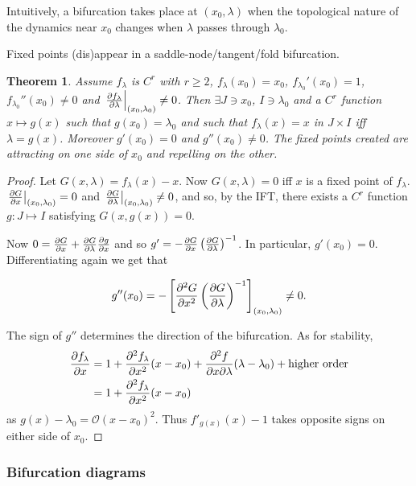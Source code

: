 \documentclass{notes}
\newcommand{\cO}{\mathcal{O}}
\theoremstyle{plain}
\newtheorem{theorem}[proposition]{Theorem}
\begin{document}
Intuitively, a bifurcation takes place at $(x_0,\lambda)$ when the
topological nature of the dynamics near $x_0$ changes when $\lambda$ passes
through $\lambda_0$.

Fixed points (dis)appear in a saddle-node/tangent/fold bifurcation.

\begin{theorem}\label{thm:snb}
  Assume $f_\lambda$ is $C^r$ with $r \ge 2$, $f_\lambda(x_0) = x_0$,
  $f_{\lambda_0}'(x_0) = 1$, $f_{\lambda_0}''(x_0) \neq 0$ and
  $\left.\frac{\partial f_\lambda}{\partial \lambda}\right|_{(x_0,\lambda_0)} \neq 0$.
  Then $\exists J \ni x_0$, $I \ni \lambda_0$ and a $C^r$ function $x
  \mapsto g(x)$ such that $g(x_0) = \lambda_0$ and such that
  $f_\lambda(x) = x$ in $J \times I$ iff $\lambda = g(x)$.  Moreover
  $g'(x_0) =0$ and $g''(x_0) \neq 0$.  The fixed points created are
  attracting on one side of $x_0$ and repelling on the other.
\end{theorem}

\begin{proof}
  Let $G(x,\lambda) = f_\lambda(x) - x$. Now $G(x,\lambda) = 0$ iff
  $x$ is a fixed point of $f_\lambda$.
  $\left.\frac{\partial G}{\partial x}\right|_{(x_0,\lambda_0)} = 0$ and
  $\left.\frac{\partial G}{\partial \lambda}\right|_{(x_0,\lambda_0)} \neq 0$, and so, by
  the IFT, there exists a $C^r$ function $g \colon J \mapsto I$
  satisfying $G(x,g(x)) = 0$.
  
  Now $0 = \frac{\partial G}{\partial x} + \frac{\partial G}{\partial \lambda}\frac{\partial g}{\partial x}$ and so $g' = -
  \frac{\partial G}{\partial x} \left( \frac{\partial G}{\partial \lambda} \right)^{-1}$.  In particular,
    $g'(x_0) = 0$.  Differentiating again we get that

\[
g''(x_0) = - \left[\frac{\partial ^2 G}{\partial x^2} \left( \frac{\partial G}{\partial \lambda} \right)^{-1}
\right]_{(x_0,\lambda_0)} \neq 0.
\]

The sign of $g''$ determines the direction of the bifurcation.  As for
stability,
\begin{align*}
\frac{\partial f_\lambda}{\partial x} &= 1 + \frac{\partial ^2 f_\lambda}{\partial x^2} (x-x_0)
+\frac{\partial ^2 f}{\partial x \partial \lambda} (\lambda - \lambda_0) + \text{higher order}\\
&= 1 + \frac{\partial ^2 f_\lambda}{\partial x^2} (x-x_0)
\end{align*}
as $g(x)-\lambda_0 = \cO(x-x_0)^2$.  Thus $f'_{g(x)}(x) - 1$
takes opposite signs on either side of $x_0$.
\end{proof}

\newpage

\subsubsection*{Bifurcation diagrams}
\end{document}
